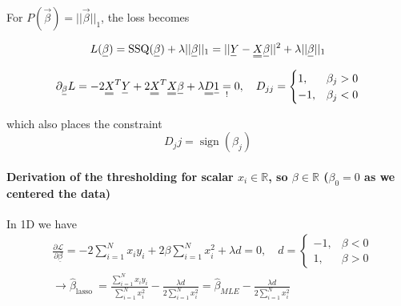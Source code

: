 
For $P(\vec{\beta}) = || \vec{\beta} ||_1$, the loss becomes

\begin{equation}
    L(\vec{\beta}) = \operatorname{SSQ}(\vec{\beta}) + \lambda || \vec{\beta} ||_1 = || \vec{Y} - \mat{X} \vec{\beta} ||^2 + \lambda || \vec{\beta} ||_1
\end{equation}


\begin{equation}
    \partial_\vec{\beta} L = -2 \mat{X}^T \vec{Y} + 2 \mat{X}^T \mat{X} \vec{\beta} + \lambda \mat{D} \vec{1} \underset{!}{=} 0, \quad D_{jj} = \begin{cases} 1, & \beta_j > 0 \\ -1, & \beta_j < 0 \end{cases}
\end{equation}

which also places the constraint
\begin{equation}
    D_jj = \operatorname{sign}(\beta_j)
\end{equation}

\paragraph{Derivation of the thresholding for scalar $x_i \in \mathbb{R}$, so $\beta \in \mathbb{R}$ ($\beta_0 = 0$ as we centered the data)} In 1D
we have
\begin{equation}
    \begin{aligned}
    & \frac{\partial \mathcal{L}}{\partial \underline{\beta}}=-2 \sum_{i=1}^N x_i y_i+2 \beta \sum_{i=1}^N x_i^2+\lambda d=0, \quad d=\left\{\begin{array}{cc}
    -1, & \beta<0 \\
    1, & \beta>0
    \end{array}\right. \\
    & \rightarrow \hat{\beta}_{\text {lasso }}=\frac{\sum_{i=1}^N x_i y_i}{\sum_{i=1}^N x_i^2}-\frac{\lambda d}{2 \sum_{i=1}^N x_i^2}=\hat{\beta}_{M L E}-\frac{\lambda d}{2 \sum_{i=1}^N x_i^2} \\
    &
    \end{aligned}
\end{equation}

